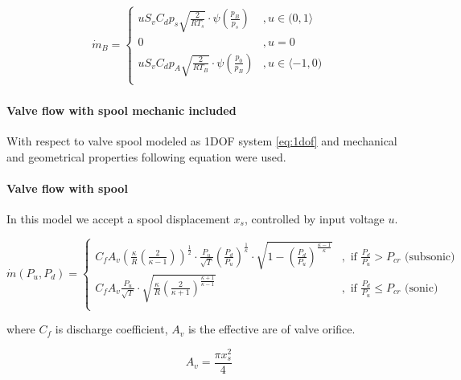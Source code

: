 \documentclass[class=article, crop=false]{standalone}
\begin{document}
\begin{align}
    \dot{m}_B =
    \begin{cases}
        u S_v C_d p_s \sqrt{\frac{2}{RT_s}}
        \cdot \psi\left(\frac{p_B}{p_s}\right)  &,   u \in (0, 1 \rangle \\
        0   &,  u = 0 \\
        u S_v C_d p_A \sqrt{\frac{2}{RT_B}}
        \cdot \psi\left(\frac{p_0}{p_B}\right)  &,   u \in \langle -1, 0) \\
    \end{cases}
\end{align}

\paragraph{Valve flow with spool mechanic included}

With respect to valve spool modeled as 1DOF system \ref{eq:1dof} and
mechanical and geometrical properties following equation were used.

\paragraph{Valve flow with spool}
In this model we accept a spool displacement $x_s$, controlled by input
voltage $u$.

\begin{equation}
    \dot{m}(P_u, P_d) = 
    \begin{cases}
        C_f A_v
        \left(\frac{\kappa}{R}\left(\frac{2}{\kappa-1}\right)\right)^{\frac{1}{2}}
        \cdot
        \frac{P_u}{\sqrt{T}}\left(\frac{P_d}{P_u}\right)^{\frac{1}{\kappa}}
        \cdot 
        \sqrt{1 - \left(\frac{P_d}{P_u}\right)^{\frac{\kappa-1}{\kappa}}} &,
            \text{ if } \frac{P_d}{P_u}>P_{cr} \text{ (subsonic)} \\
        C_f A_v \frac{P_u}{\sqrt{T}}\cdot \sqrt{\frac{\kappa}{R}
        \left(\frac{2}{\kappa + 1}\right)^{\frac{\kappa+1}{\kappa-1}}} &,
            \text{ if }  \frac{P_d}{P_u} \le P_{cr} \text{ (sonic)} \\
    \end{cases}
    \label{eq:valve_2}
\end{equation}

where $C_f$ is discharge coefficient, $A_v$ is the effective are of valve
orifice.

\begin{equation}
    A_v = \frac{\pi x_s^2}{4}
    \label{eq:A_v}
\end{equation}
\end{document}
